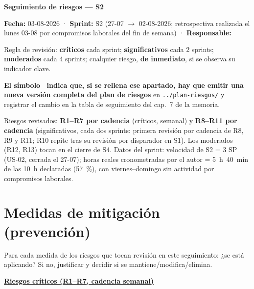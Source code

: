 \documentclass[11pt,a4paper]{article}
\begin{document}
\begin{center}
  {\LARGE\bfseries Seguimiento de riesgos — S2}\\[6pt]
\end{center}

\textbf{Fecha:} 03-08-2026 · \textbf{Sprint:} S2 (27-07 \(\to\) 02-08-2026; retrospectiva realizada el lunes 03-08 por compromisos laborales del fin de semana) · \textbf{Responsable:} \thesisAuthor

Regla de revisión: \textbf{críticos} cada sprint; \textbf{significativos} cada 2 sprints; \textbf{moderados} cada 4 sprints; cualquier riesgo, \textbf{de inmediato}, si se observa su indicador clave.

\textbf{El símbolo \updatesymbol\ indica que, si se rellena ese apartado, hay que emitir una nueva versión completa del plan de riesgos} en \texttt{../plan-riesgos/} y registrar el cambio en la tabla de seguimiento del cap.~7 de la memoria.

Riesgos revisados: \textbf{R1–R7 por cadencia} (críticos, semanal) y \textbf{R8–R11 por cadencia} (significativos, cada dos sprints: primera revisión por cadencia de R8, R9 y R11; R10 repite tras su revisión por disparador en S1).
Los moderados (R12, R13) tocan en el cierre de S4.
Datos del sprint: velocidad de S2 = 3 SP (US-02, cerrada el 27-07); horas reales cronometradas por el autor = 5~h~40~min de las 10~h declaradas (57~\%), con viernes--domingo sin actividad por compromisos laborales.

\bigline

\section{Medidas de mitigación (prevención)}

Para cada medida de los riesgos que tocan revisión en este seguimiento: ¿se está aplicando?
Si no, justificar y decidir si se mantiene/modifica/elimina.

\underline{\textbf{Riesgos críticos (R1--R7, cadencia semanal)}}
\end{document}
